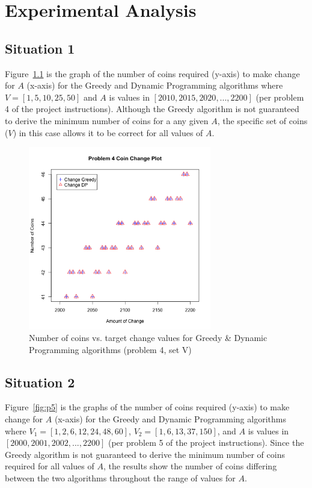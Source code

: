 \documentclass[11pt]{scrreprt}
\begin{document}
\chapter{Experimental Analysis}

\section{Situation 1}

Figure~\ref{fig:p4} is the graph of the number of coins required (y-axis) to make change for $A$ (x-axis) for the Greedy and Dynamic Programming algorithms where $V = [1, 5, 10, 25, 50]$ and $A$ is values in $[2010, 2015, 2020, ..., 2200]$  (per problem 4 of the project instructions). Although the Greedy algorithm is not guaranteed to derive the minimum number of coins for a any given $A$, the specific set of coins ($V$) in this case allows it to be correct for all values of $A$.

\begin{figure}[!htbp]
\centering
\includegraphics[width=8cm]{situation1.png}
\caption{Number of coins vs. target change values for Greedy \& Dynamic Programming algorithms (problem 4, set V)}
\label{fig:p4}
\end{figure}

\section{Situation 2}

Figure~\ref{fig:p5} is the graphs of the number of coins required (y-axis) to make change for $A$ (x-axis) for the Greedy and Dynamic Programming algorithms where $V_1 = [1, 2, 6, 12, 24, 48, 60]$, $V_2 = [1, 6, 13, 37, 150]$, and $A$ is values in $[2000, 2001, 2002, ..., 2200]$ (per problem 5 of the project instructions). Since the Greedy algorithm is not guaranteed to derive the minimum number of coins required for all values of $A$, the results show the number of coins differing between the two algorithms throughout the range of values for $A$.
\end{document}
